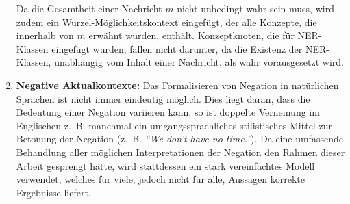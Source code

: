 \begin{enumerate}
		Da die Gesamtheit einer Nachricht $m$ nicht unbedingt wahr sein muss, wird zudem ein Wurzel-Möglichkeitskontext eingefügt, der alle Konzepte, die innerhalb von $m$ erwähnt wurden, enthält.
		Konzeptknoten, die für NER-Klassen eingefügt wurden, fallen nicht darunter, da die Existenz der NER-Klassen, unabhängig vom Inhalt einer Nachricht, als wahr vorausgesetzt wird.

	\item \textbf{Negative Aktualkontexte:}
		Das Formalisieren von Negation in natürlichen Sprachen ist nicht immer eindeutig möglich.
		Dies liegt daran, dass die Bedeutung einer Negation variieren kann, so ist doppelte Verneinung im Englischen z.~B. manchmal ein umgangssprachliches stilistisches Mittel zur Betonung der Negation (z.~B. \textit{``We don't have no time.''}).
		Da eine umfassende Behandlung aller möglichen Interpretationen der Negation den Rahmen dieser Arbeit gesprengt hätte, wird stattdessen ein stark vereinfachtes Modell verwendet, welches für viele, jedoch nicht für alle, Aussagen korrekte Ergebnisse liefert.


\end{enumerate}
